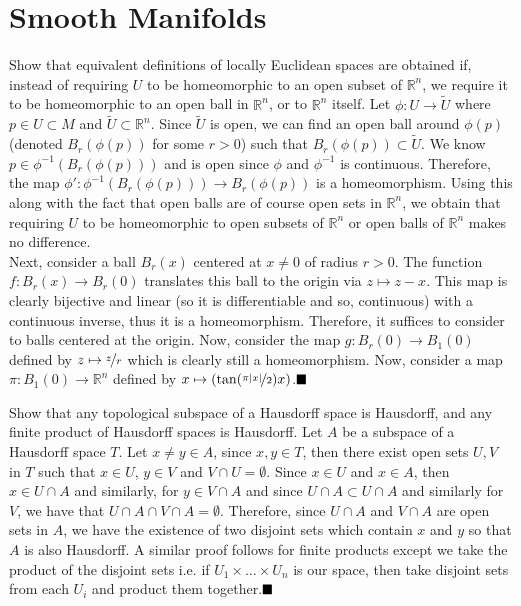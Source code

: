 \documentclass[12pt]{article}
\begin{document}
\section{Smooth Manifolds}

\begin{ExerciseList}
  \Exercise
 	Show that equivalent definitions of locally Euclidean spaces are obtained if, instead of requiring $U$ to be homeomorphic to an open subset of $\mathbb{R}^n$, we require it to be 
  	homeomorphic to an open ball in $\mathbb{R}^n$, or to $\mathbb{R}^n$ itself. 
  \Answer
  	Let $\phi: U\to\tilde{U}$ where $p\in U\subset M$ and $\tilde{U}\subset\mathbb{R}^n$. Since $\tilde{U}$ is open,
        we can find an open ball around $\phi(p)$ (denoted $B_r(\phi(p))$ for some $r>0$) such that $B_r(\phi(p))\subset\tilde{U}$.
        We know $p\in \phi^{-1}(B_r(\phi(p)))$ and is open since $\phi$ and $\phi^{-1}$ is continuous. Therefore, the map
        $\phi': \phi^{-1}(B_r(\phi(p))) \to B_r(\phi(p))$ is a homeomorphism. Using this along with the fact that open balls
        are of course open sets in $\mathbb{R}^n$, we obtain that requiring $U$ to be homeomorphic to open subsets of $\mathbb{R}^n$
        or open balls of $\mathbb{R}^n$ makes no difference.\\
        
        Next, consider a ball $B_r(x)$ centered at $x\neq 0$ of radius $r>0$. The function $f: B_r(x)\to B_r(0)$ translates this
        ball to the origin via $z\mapsto z-x$. This map is clearly bijective and linear (so it is differentiable and so, continuous)
        with a continuous inverse, thus it is a homeomorphism. Therefore, it suffices to consider to balls centered at the origin.
        Now, consider the map $g: B_r(0) \to B_1(0)$ defined by $z\mapsto \nicefrac{z}{r}$ which is clearly still a homeomorphism.
        Now, consider a map $\pi: B_1(0)\to\mathbb{R}^n$ defined by $x\mapsto (\tan(\nicefrac{\pi|x|}{2})x)$.$\hfill\blacksquare$
  
  \Exercise
  	Show that any topological subspace of a Hausdorff space is Hausdorff, and any finite product of Hausdorff spaces is Hausdorff.
  \Answer
  	Let $A$ be a subspace of a Hausdorff space $T$. Let $x\neq y\in A$, since $x,y\in T$, then there exist open sets $U,V$
        in $T$ such that $x\in U$, $y\in V$ and $V\cap U=\emptyset$. Since $x\in U$ and $x\in A$, then $x\in U\cap A$ and similarly,
        for $y\in V\cap A$ and since $U\cap A\subset U\cap A$ and similarly for $V$, we have that $U\cap A \cap V \cap A = \emptyset$.
        Therefore, since $U\cap A$ and $V\cap A$ are open sets in $A$, we have the existence of two disjoint sets which contain
        $x$ and $y$ so that $A$ is also Hausdorff. A similar proof follows for finite products except we take the product of
        the disjoint sets i.e. if $U_1\times\hdots\times U_n$ is our space, then take disjoint sets from each $U_i$ and product
        them together.$\hfill\blacksquare$
  

\end{ExerciseList}
\end{document}
